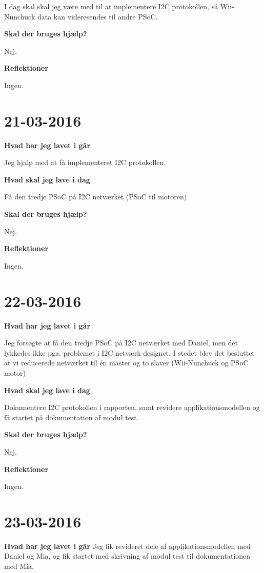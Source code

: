 \documentclass{article}
\begin{document}
	I dag skal skal jeg være med til at implementere I2C protokollen, så Wii-Nunchuck data kan videresendes til andre PSoC.
	
	\textbf{Skal der bruges hjælp?}
	
	Nej.
	
	\textbf{Reflektioner}
	
	Ingen.
	
	\section{21-03-2016}
	
	\textbf{Hvad har jeg lavet i går}
	
	Jeg hjalp med at få implementeret I2C protokollen.
	
	\textbf{Hvad skal jeg lave i dag}
	
	Få den tredje PSoC på I2C netværket (PSoC til motoren)
	
	\textbf{Skal der bruges hjælp?}
	
	Nej.
	
	\textbf{Reflektioner}
	
	Ingen.
	
	\section{22-03-2016}
	
	\textbf{Hvad har jeg lavet i går}
	
	Jeg forsøgte at få den tredje PSoC på I2C netværket med Daniel, men det lykkedes ikke pga. problemet i I2C netværk designet. I stedet blev det besluttet at vi reducerede netværket til én master og to slaver (Wii-Nunchuck og PSoC motor) 
	
	\textbf{Hvad skal jeg lave i dag}
	
	Dokumentere I2C protokollen i rapporten, samt revidere applikationsmodellen og få startet på dokumentation af modul test.
	
	\textbf{Skal der bruges hjælp?}
	
	Nej.
	
	\textbf{Reflektioner}
	
	Ingen.	

	\section{23-03-2016}
	
	\textbf{Hvad har jeg lavet i går}
	Jeg fik revideret dele af applikationsmodellen med Daniel og Mia, og fik startet med skrivning af modul test til dokumentationen med Mia. 
	
\end{document}
